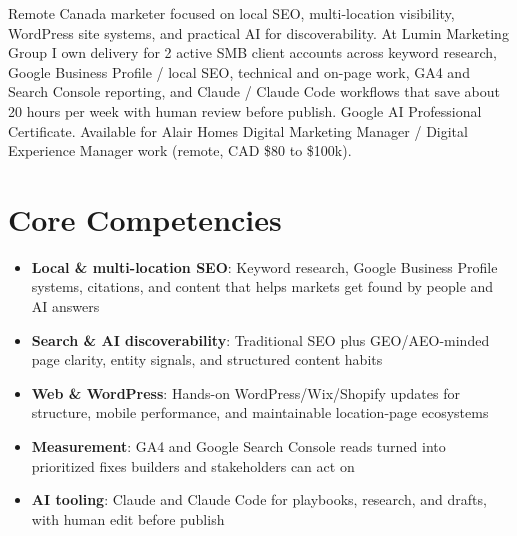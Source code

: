 \documentclass[11pt,a4paper,sans]{moderncv}
\begin{document}
\makecvtitle

\vspace{6pt}
\small{Remote Canada marketer focused on local SEO, multi-location visibility, WordPress site systems, and practical AI for discoverability. At Lumin Marketing Group I own delivery for 2 active SMB client accounts across keyword research, Google Business Profile / local SEO, technical and on-page work, GA4 and Search Console reporting, and Claude / Claude Code workflows that save about 20 hours per week with human review before publish. Google AI Professional Certificate. Available for Alair Homes Digital Marketing Manager / Digital Experience Manager work (remote, CAD \$80 to \$100k).}

\section{Core Competencies}
\vspace{1pt}
\begin{itemize}
\item \textbf{Local \& multi-location SEO}: Keyword research, Google Business Profile systems, citations, and content that helps markets get found by people and AI answers
\item \textbf{Search \& AI discoverability}: Traditional SEO plus GEO/AEO-minded page clarity, entity signals, and structured content habits
\item \textbf{Web \& WordPress}: Hands-on WordPress/Wix/Shopify updates for structure, mobile performance, and maintainable location-page ecosystems
\item \textbf{Measurement}: GA4 and Google Search Console reads turned into prioritized fixes builders and stakeholders can act on
\item \textbf{AI tooling}: Claude and Claude Code for playbooks, research, and drafts, with human edit before publish
\end{itemize}
\end{document}
